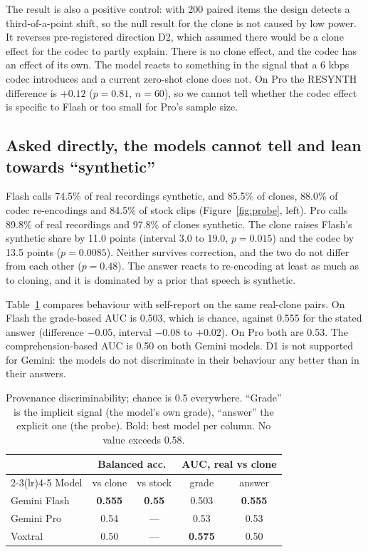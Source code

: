 The result is also a positive control: with 200 paired items the design detects a third-of-a-point shift, so the null result for the clone is not caused by low power. It reverses pre-registered direction D2, which assumed there would be a clone effect for the codec to partly explain. There is no clone effect, and the codec has an effect of its own. The model reacts to something in the signal that a 6 kbps codec introduces and a current zero-shot clone does not. On Pro the RESYNTH difference is $+0.12$ ($p = 0.81$, $n = 60$), so we cannot tell whether the codec effect is specific to Flash or too small for Pro's sample size.

\subsection{Asked directly, the models cannot tell and lean towards ``synthetic''}
\label{sec:results-probe}

Flash calls 74.5\% of real recordings synthetic, and 85.5\% of clones, 88.0\% of codec re-encodings and 84.5\% of stock clips (Figure~\ref{fig:probe}, left). Pro calls 89.8\% of real recordings and 97.8\% of clones synthetic. The clone raises Flash's synthetic share by 11.0 points (interval 3.0 to 19.0, $p = 0.015$) and the codec by 13.5 points ($p = 0.0085$). Neither survives correction, and the two do not differ from each other ($p = 0.48$). The answer reacts to re-encoding at least as much as to cloning, and it is dominated by a prior that speech is synthetic.

Table~\ref{tab:disc} compares behaviour with self-report on the same real-clone pairs. On Flash the grade-based AUC is 0.503, which is chance, against 0.555 for the stated answer (difference $-0.05$, interval $-0.08$ to $+0.02$). On Pro both are 0.53. The comprehension-based AUC is 0.50 on both Gemini models. D1 is not supported for Gemini: the models do not discriminate in their behaviour any better than in their answers.

\begin{table}[t]
\small
\centering
\setlength{\tabcolsep}{4pt}
\begin{tabular}{lcccc}
\toprule
 & \multicolumn{2}{c}{Balanced acc.} & \multicolumn{2}{c}{AUC, real vs clone} \\
\cmidrule(lr){2-3}\cmidrule(lr){4-5}
Model & vs clone & vs stock & grade & answer \\
\midrule
Gemini Flash & \textbf{0.555} & \textbf{0.55} & 0.503 & \textbf{0.555} \\
Gemini Pro & 0.54 & --- & 0.53 & 0.53 \\
Voxtral & 0.50 & --- & \textbf{0.575} & 0.50 \\
\bottomrule
\end{tabular}
\caption{Provenance discriminability; chance is 0.5 everywhere. ``Grade'' is the implicit signal (the model's own grade), ``answer'' the explicit one (the probe). Bold: best model per column. No value exceeds 0.58.}
\label{tab:disc}
\end{table}

